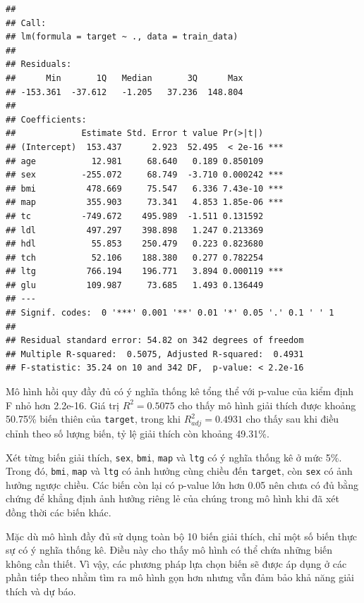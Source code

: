 \documentclass[
]{article}
\begin{document}
\begin{verbatim}
## 
## Call:
## lm(formula = target ~ ., data = train_data)
## 
## Residuals:
##      Min       1Q   Median       3Q      Max 
## -153.361  -37.612   -1.205   37.236  148.804 
## 
## Coefficients:
##             Estimate Std. Error t value Pr(>|t|)    
## (Intercept)  153.437      2.923  52.495  < 2e-16 ***
## age           12.981     68.640   0.189 0.850109    
## sex         -255.072     68.749  -3.710 0.000242 ***
## bmi          478.669     75.547   6.336 7.43e-10 ***
## map          355.903     73.341   4.853 1.85e-06 ***
## tc          -749.672    495.989  -1.511 0.131592    
## ldl          497.297    398.898   1.247 0.213369    
## hdl           55.853    250.479   0.223 0.823680    
## tch           52.106    188.380   0.277 0.782254    
## ltg          766.194    196.771   3.894 0.000119 ***
## glu          109.987     73.685   1.493 0.136449    
## ---
## Signif. codes:  0 '***' 0.001 '**' 0.01 '*' 0.05 '.' 0.1 ' ' 1
## 
## Residual standard error: 54.82 on 342 degrees of freedom
## Multiple R-squared:  0.5075, Adjusted R-squared:  0.4931 
## F-statistic: 35.24 on 10 and 342 DF,  p-value: < 2.2e-16
\end{verbatim}

Mô hình hồi quy đầy đủ có ý nghĩa thống kê tổng thể với p-value của kiểm
định F nhỏ hơn 2.2e-16. Giá trị \(R^2 = 0.5075\) cho thấy mô hình giải
thích được khoảng 50.75\% biến thiên của \texttt{target}, trong khi
\(R^2_{adj} = 0.4931\) cho thấy sau khi điều chỉnh theo số lượng biến,
tỷ lệ giải thích còn khoảng 49.31\%.

Xét từng biến giải thích, \texttt{sex}, \texttt{bmi}, \texttt{map} và
\texttt{ltg} có ý nghĩa thống kê ở mức 5\%. Trong đó, \texttt{bmi},
\texttt{map} và \texttt{ltg} có ảnh hưởng cùng chiều đến
\texttt{target}, còn \texttt{sex} có ảnh hưởng ngược chiều. Các biến còn
lại có p-value lớn hơn 0.05 nên chưa có đủ bằng chứng để khẳng định ảnh
hưởng riêng lẻ của chúng trong mô hình khi đã xét đồng thời các biến
khác.

Mặc dù mô hình đầy đủ sử dụng toàn bộ 10 biến giải thích, chỉ một số
biến thực sự có ý nghĩa thống kê. Điều này cho thấy mô hình có thể chứa
những biến không cần thiết. Vì vậy, các phương pháp lựa chọn biến sẽ
được áp dụng ở các phần tiếp theo nhằm tìm ra mô hình gọn hơn nhưng vẫn
đảm bảo khả năng giải thích và dự báo.
\end{document}
